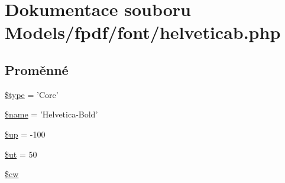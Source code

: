 \hypertarget{helveticab_8php}{\section{Dokumentace souboru Models/fpdf/font/helveticab.php}
\label{helveticab_8php}
}
\subsection*{Proměnné}
\begin{DoxyCompactItemize}
\item 
\hyperlink{helveticab_8php_a9a4a6fba2208984cabb3afacadf33919}{\$type} = 'Core'
\item 
\hyperlink{helveticab_8php_ab2fc40d43824ea3e1ce5d86dee0d763b}{\$name} = 'Helvetica-\/Bold'
\item 
\hyperlink{helveticab_8php_a6b5ad2ac55f9df46e8f34e78fbd6f176}{\$up} = -\/100
\item 
\hyperlink{helveticab_8php_aadd3f841051043ee58e587e840e8dd0b}{\$ut} = 50
\item 
\hyperlink{helveticab_8php_ac2951b03dbb0317e6c61ec920b7479dc}{\$cw}
\end{DoxyCompactItemize}


